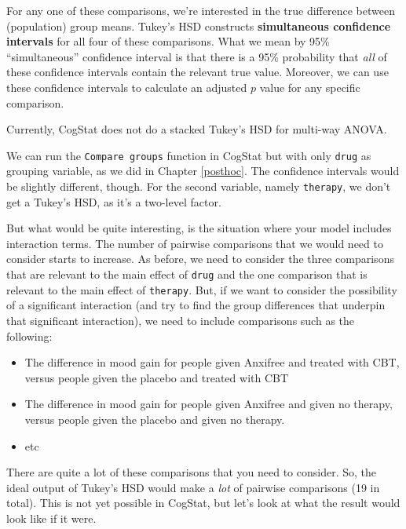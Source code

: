\documentclass[
  11pt,
  a4paper,
  twoside,symmetric,openright]{book}
\providecommand{\tightlist}{%
  \setlength{\itemsep}{0pt}\setlength{\parskip}{0pt}}
\theoremstyle{break}
\theoremstyle{break}
\begin{document}
For any one of these comparisons, we're interested in the true difference between (population) group means. Tukey's HSD constructs \textbf{simultaneous confidence intervals} for all four of these comparisons. What we mean by 95\% ``simultaneous'' confidence interval is that there is a 95\% probability that \emph{all} of these confidence intervals contain the relevant true value. Moreover, we can use these confidence intervals to calculate an adjusted \(p\) value for any specific comparison.

Currently, CogStat does not do a stacked Tukey's HSD for multi-way ANOVA.

We can run the \texttt{Compare\ groups} function in CogStat but with only \texttt{drug} as grouping variable, as we did in Chapter \ref{posthoc}. The confidence intervals would be slightly different, though. For the second variable, namely \texttt{therapy}, we don't get a Tukey's HSD, as it's a two-level factor.

But what would be quite interesting, is the situation where your model includes interaction terms. The number of pairwise comparisons that we would need to consider starts to increase. As before, we need to consider the three comparisons that are relevant to the main effect of \texttt{drug} and the one comparison that is relevant to the main effect of \texttt{therapy}. But, if we want to consider the possibility of a significant interaction (and try to find the group differences that underpin that significant interaction), we need to include comparisons such as the following:

\begin{itemize}
\tightlist
\item
  The difference in mood gain for people given Anxifree and treated with CBT, versus people given the placebo and treated with CBT
\item
  The difference in mood gain for people given Anxifree and given no therapy, versus people given the placebo and given no therapy.
\item
  etc
\end{itemize}

There are quite a lot of these comparisons that you need to consider. So, the ideal output of Tukey's HSD would make a \emph{lot} of pairwise comparisons (19 in total). This is not yet possible in CogStat, but let's look at what the result would look like if it were.
\end{document}
